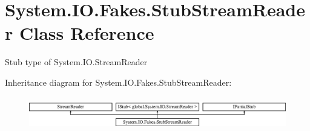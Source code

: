 \hypertarget{class_system_1_1_i_o_1_1_fakes_1_1_stub_stream_reader}{\section{System.\-I\-O.\-Fakes.\-Stub\-Stream\-Reader Class Reference}
\label{class_system_1_1_i_o_1_1_fakes_1_1_stub_stream_reader}
}


Stub type of System.\-I\-O.\-Stream\-Reader 


Inheritance diagram for System.\-I\-O.\-Fakes.\-Stub\-Stream\-Reader\-:\begin{figure}[H]
\begin{center}
\leavevmode
\includegraphics[height=1.487384cm]{class_system_1_1_i_o_1_1_fakes_1_1_stub_stream_reader}
\end{center}
\end{figure}
